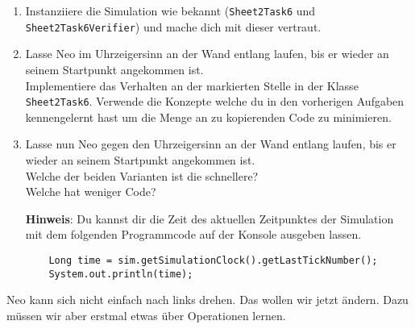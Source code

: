 

\begin{enumerate}
    \item Instanziiere die Simulation wie bekannt (\lstinline{Sheet2Task6} und \lstinline{Sheet2Task6Verifier}) und mache dich mit dieser vertraut.
    \item Lasse Neo im Uhrzeigersinn an der Wand entlang laufen, bis er wieder an seinem Startpunkt angekommen ist.\\
        Implementiere das Verhalten an der markierten Stelle in der Klasse \lstinline{Sheet2Task6}. Verwende die Konzepte welche du in den vorherigen Aufgaben kennengelernt hast um die Menge an zu kopierenden Code zu minimieren.
    \item Lasse nun Neo gegen den Uhrzeigersinn an der Wand entlang laufen, bis er wieder an seinem Startpunkt angekommen ist.\\
        Welche der beiden Varianten ist die schnellere?\\
        Welche hat weniger Code?

    \textbf{Hinweis}: Du kannst dir die Zeit des aktuellen Zeitpunktes der Simulation mit dem folgenden Programmcode auf der Konsole ausgeben lassen.

        \begin{lstlisting}
    Long time = sim.getSimulationClock().getLastTickNumber();
    System.out.println(time);
        \end{lstlisting}

        
\end{enumerate}

        Neo kann sich nicht einfach nach links drehen.
        Das wollen wir jetzt ändern.
        Dazu müssen wir aber erstmal etwas über Operationen lernen.

